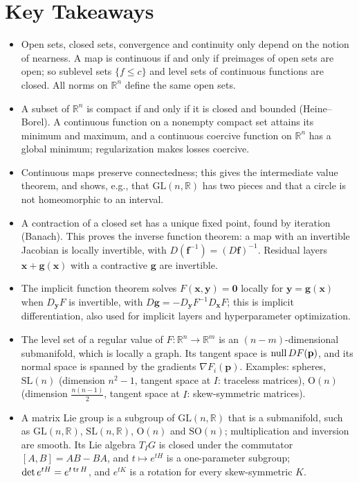 \section*{Key Takeaways}
\begin{itemize}[leftmargin=*]
    \item Open sets, closed sets, convergence and continuity only depend on the notion of nearness. A map is continuous if and only if preimages of open sets are open; so sublevel sets $\{f \leq c\}$ and level sets of continuous functions are closed. All norms on $\mathbb{R}^n$ define the same open sets.
    \item A subset of $\mathbb{R}^n$ is compact if and only if it is closed and bounded (Heine--Borel). A continuous function on a nonempty compact set attains its minimum and maximum, and a continuous coercive function on $\mathbb{R}^n$ has a global minimum; regularization makes losses coercive.
    \item Continuous maps preserve connectedness; this gives the intermediate value theorem, and shows, e.g., that $\mathrm{GL}(n, \mathbb{R})$ has two pieces and that a circle is not homeomorphic to an interval.
    \item A contraction of a closed set has a unique fixed point, found by iteration (Banach). This proves the inverse function theorem: a map with an invertible Jacobian is locally invertible, with $D(\mathbf{f}^{-1}) = (D\mathbf{f})^{-1}$. Residual layers $\mathbf{x} + \mathbf{g}(\mathbf{x})$ with a contractive $\mathbf{g}$ are invertible.
    \item The implicit function theorem solves $F(\mathbf{x}, \mathbf{y}) = \mathbf{0}$ locally for $\mathbf{y} = \mathbf{g}(\mathbf{x})$ when $D_{\mathbf{y}}F$ is invertible, with $D\mathbf{g} = -D_{\mathbf{y}}F^{-1}D_{\mathbf{x}}F$; this is implicit differentiation, also used for implicit layers and hyperparameter optimization.
    \item The level set of a regular value of $F: \mathbb{R}^n \to \mathbb{R}^m$ is an $(n - m)$-dimensional submanifold, which is locally a graph. Its tangent space is $\operatorname{null} DF(\mathbf{p})$, and its normal space is spanned by the gradients $\nabla F_i(\mathbf{p})$. Examples: spheres, $\mathrm{SL}(n)$ (dimension $n^2 - 1$, tangent space at $I$: traceless matrices), $\mathrm{O}(n)$ (dimension $\frac{n(n-1)}{2}$, tangent space at $I$: skew-symmetric matrices).
    \item A matrix Lie group is a subgroup of $\mathrm{GL}(n, \mathbb{R})$ that is a submanifold, such as $\mathrm{GL}(n, \mathbb{R})$, $\mathrm{SL}(n, \mathbb{R})$, $\mathrm{O}(n)$ and $\mathrm{SO}(n)$; multiplication and inversion are smooth. Its Lie algebra $T_IG$ is closed under the commutator $[A, B] = AB - BA$, and $t \mapsto e^{tH}$ is a one-parameter subgroup; $\det e^{tH} = e^{t\operatorname{tr} H}$, and $e^{tK}$ is a rotation for every skew-symmetric $K$.

\end{itemize}
